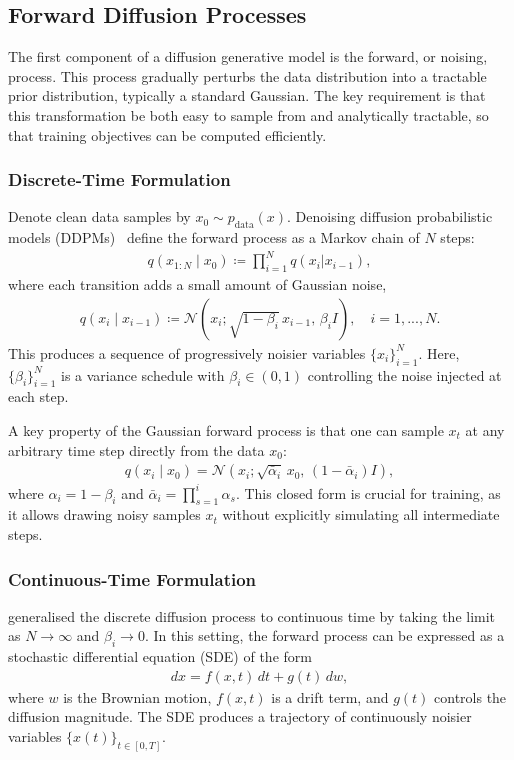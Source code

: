 \documentclass[a4paper,12pt]{article}
\begin{document}
\subsection{Forward Diffusion Processes}
The first component of a diffusion generative model is the forward, or noising, process. 
This process gradually perturbs the data distribution into a tractable prior distribution, typically a standard Gaussian. The key requirement is that this transformation be both easy to sample from and analytically tractable, so that training objectives can be computed efficiently.

\subsubsection{Discrete-Time Formulation}
Denote clean data samples by \(x_0 \sim p_{\text{data}}(x)\). Denoising diffusion probabilistic models (DDPMs)~\citep{hoDenoisingDiffusionProbabilistic2020} define the forward process as a Markov chain of \(N\) steps:
\begin{align*}
    q\left(x_{1:N}\mid x_0\right)\coloneq\prod_{i=1}^{N}q\left(x_i|x_{i-1}\right),
\end{align*}
where each transition adds a small amount of Gaussian noise,
\begin{align}\label{eq:DDPM-transition-kernel}
    q\left(x_i \mid x_{i-1}\right)\coloneq\mathcal{N}\!\left(x_i ; \sqrt{1-\beta_i}\,x_{i-1}, \, \beta_i I \right),\quad i=1,...,N.
\end{align}
This produces a sequence of progressively noisier variables \(\{x_i\}_{i=1}^N\). Here, \(\{\beta_i\}_{i=1}^N\) is a variance schedule with \(\beta_i \in (0,1)\) controlling the noise injected at each step.

A key property of the Gaussian forward process is that one can sample \(x_t\) at any arbitrary time step directly from the data \(x_0\):
\begin{align}\label{eq:DDPM-solution}
    q\left(x_i \mid x_0\right) = \mathcal{N}\!\left(x_i ; \sqrt{\bar \alpha_i}\,x_0, \,(1-\bar \alpha_i) I \right),
\end{align}
where \(\alpha_i = 1 - \beta_i\) and \(\bar \alpha_i = \prod_{s=1}^i \alpha_s\). This closed form is crucial for training, as it allows drawing noisy samples \(x_t\) without explicitly simulating all intermediate steps.

\subsubsection{Continuous-Time Formulation}\label{sec:forward-SDE-continuous}
\citet{song2021ScoreBasedGenerativeModeling} generalised the discrete diffusion process to continuous time by taking the limit as \(N \to \infty\) and \(\beta_i \to 0\). In this setting, the forward process can be expressed as a stochastic differential equation (SDE) of the form
\begin{align}\label{eq:forward_sde}
    dx = f(x,t)\,dt + g(t)\,dw,
\end{align}
where \(w\) is the Brownian motion, \(f(x,t)\) is a drift term, and \(g(t)\) controls the diffusion magnitude. The SDE produces a trajectory of continuously noisier variables \(\{x(t)\}_{t \in [0,T]}\).
\end{document}
